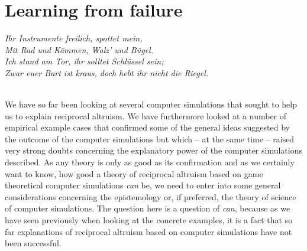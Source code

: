 \chapter{Learning from failure}

\hspace{5cm}\begin{minipage}[b]{8cm}
\setlength{\baselineskip}{1.1ex}
{\em{\scriptsize Ihr Instrumente freilich, spottet mein,\\
Mit Rad und Kämmen, Walz' und Bügel.\\
Ich stand am Tor, ihr solltet Schlüssel sein;\\
Zwar euer Bart ist kraus, doch hebt ihr nicht die Riegel.\\
  \\
\hspace*{3.5cm}{\em Goethe, Faust I}}}
\end{minipage}

\label{limitsOfModeling}
\vspace{0.5cm}
We have so far been looking at several computer simulations that
sought to help us to explain reciprocal altruism. We have furthermore
looked at a number of empirical example cases that confirmed some of
the general ideas suggested by the outcome of the computer simulations
but which -- at the same time -- raised very strong doubts concerning
the explanatory power of the computer simulations described. As any
theory is only as good as its confirmation and as we certainly want to
know, how good a theory of reciprocal altruism based on game
theoretical computer simulations {\em can} be, we need to enter into
some general considerations concerning the epistemology or, if
preferred, the theory of science of computer simulations. The question
here is a question of {\em can}, because as we have seen previously
when looking at the concrete examples, it is a fact that so far
explanations of reciprocal altruism based on computer simulations have
not been successful.

